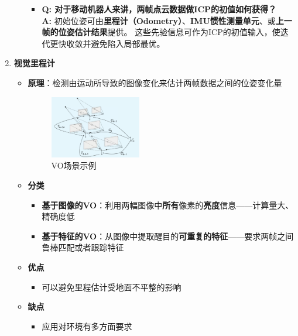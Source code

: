 \documentclass[../main.tex]{subfiles}
\begin{document}
\begin{enumerate}
\begin{itemize}
\begin{itemize}
            \item \textbf{Q: 对于移动机器人来讲，两帧点云数据做ICP的初值如何获得？} \\
            \textbf{A:} 初始位姿可由\textbf{里程计（Odometry）}、\textbf{IMU惯性测量单元}、或\textbf{上一帧的位姿估计结果}提供。  
            这些先验信息可作为ICP的初值输入，使迭代更快收敛并避免陷入局部最优。
        \end{itemize}
    \end{itemize}
    \item \textbf{视觉里程计}\label{visual}
        \begin{itemize}
            \item \textbf{原理}：检测由运动所导致的图像变化来估计两帧数据之间的位姿变化量
                    \begin{figure}[H]
                        \centering
                        \includegraphics[width=0.4\textwidth]{images/vo.png}
                        \caption{VO场景示例}
                    \end{figure}
            \item \textbf{分类}
                \begin{itemize}
                    \item \textbf{基于图像的VO}：利用两幅图像中\textbf{所有}像素的\textbf{亮度}信息——计算量大、精确度低
                    \item \textbf{基于特征的VO}：从图像中提取醒目的\textbf{可重复的特征}——要求两帧之间鲁棒匹配或者跟踪特征
                \end{itemize}
            \item \textbf{优点}
                \begin{itemize}
                    \item 可以避免里程估计受地面不平整的影响
                \end{itemize}
            \item \textbf{缺点}
                \begin{itemize}
                    \item 应用对环境有多方面要求
                        \begin{enumerate}

\end{enumerate}
\end{itemize}
\end{itemize}
\end{enumerate}
\end{document}
